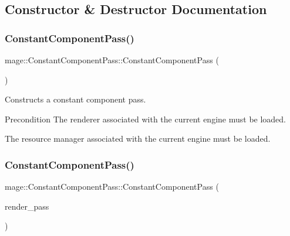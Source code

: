 \subsection{Constructor \& Destructor Documentation}
\hypertarget{classmage_1_1_constant_component_pass_acd197274863c82c9f1551c7e6171e4c9}{}\label{classmage_1_1_constant_component_pass_acd197274863c82c9f1551c7e6171e4c9} 
\subsubsection{\texorpdfstring{Constant\+Component\+Pass()}{ConstantComponentPass()}\hspace{0.1cm}{\footnotesize\ttfamily [1/3]}}
{\footnotesize\ttfamily mage\+::\+Constant\+Component\+Pass\+::\+Constant\+Component\+Pass (\begin{DoxyParamCaption}{ }\end{DoxyParamCaption})}

Constructs a constant component pass.

\begin{DoxyPrecond}{Precondition}
The renderer associated with the current engine must be loaded. 

The resource manager associated with the current engine must be loaded. 
\end{DoxyPrecond}
\hypertarget{classmage_1_1_constant_component_pass_ac3112acde3a0504febef699873efe1ff}{}\label{classmage_1_1_constant_component_pass_ac3112acde3a0504febef699873efe1ff} 
\subsubsection{\texorpdfstring{Constant\+Component\+Pass()}{ConstantComponentPass()}\hspace{0.1cm}{\footnotesize\ttfamily [2/3]}}
{\footnotesize\ttfamily mage\+::\+Constant\+Component\+Pass\+::\+Constant\+Component\+Pass (\begin{DoxyParamCaption}\item[{const \hyperlink{classmage_1_1_constant_component_pass}{Constant\+Component\+Pass} \&}]{render\+\_\+pass }\end{DoxyParamCaption})\hspace{0.3cm}{\ttfamily [delete]}}

